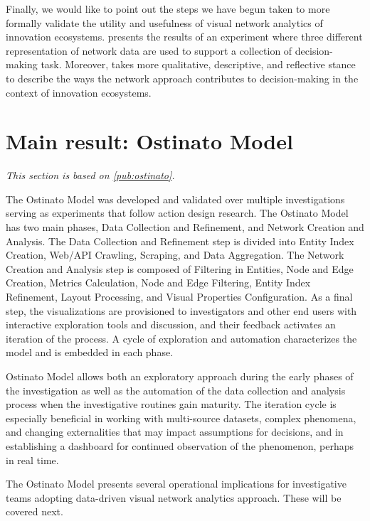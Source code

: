 Finally, we would like to point out the steps we have begun taken to more formally validate the utility and usefulness of visual network analytics of innovation ecosystems. \cite{Basole2016EnablingAnalysis} presents the results of an experiment where three different representation of network data are used to support a collection of decision-making task. Moreover, \cite{Russell2015IFKAD} takes more qualitative, descriptive, and reflective stance to describe the ways the network approach contributes to decision-making in the context of innovation ecosystems. 

\section{Main result: Ostinato Model}

\textit{This section is based on \ref{pub:ostinato}.}

The Ostinato Model was developed and validated over multiple investigations serving as experiments that follow action design research. The Ostinato Model has two main phases, Data Collection and Refinement, and Network Creation and Analysis. The Data Collection and Refinement step is divided into Entity Index Creation, Web/API Crawling, Scraping, and Data Aggregation. The Network Creation and Analysis step is composed of Filtering in Entities, Node and Edge Creation, Metrics Calculation, Node and Edge Filtering, Entity Index Refinement, Layout Processing, and Visual Properties Configuration. As a final step, the visualizations are provisioned to investigators and other end users with interactive exploration tools and discussion, and their feedback activates an iteration of the process. A cycle of exploration and automation characterizes the model and is embedded in each phase.

Ostinato Model allows both an exploratory approach during the early phases of the investigation as well as the automation of the data collection and analysis process when the investigative routines gain maturity. The iteration cycle is especially beneficial in working with multi-source datasets, complex phenomena, and changing externalities that may impact assumptions for decisions, and in establishing a dashboard for continued observation of the phenomenon, perhaps in real time.

The Ostinato Model presents several operational implications for investigative teams adopting data-driven visual network analytics approach. These will be covered next.

